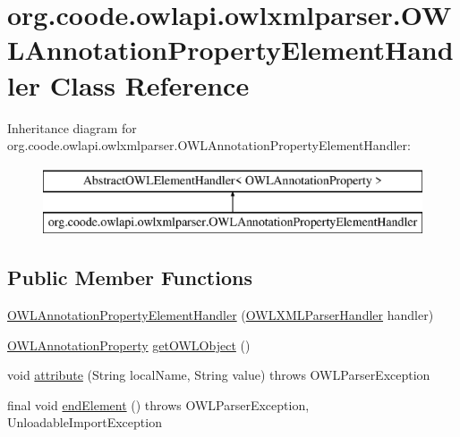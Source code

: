 \hypertarget{classorg_1_1coode_1_1owlapi_1_1owlxmlparser_1_1_o_w_l_annotation_property_element_handler}{\section{org.\-coode.\-owlapi.\-owlxmlparser.\-O\-W\-L\-Annotation\-Property\-Element\-Handler Class Reference}
\label{classorg_1_1coode_1_1owlapi_1_1owlxmlparser_1_1_o_w_l_annotation_property_element_handler}
}
Inheritance diagram for org.\-coode.\-owlapi.\-owlxmlparser.\-O\-W\-L\-Annotation\-Property\-Element\-Handler\-:\begin{figure}[H]
\begin{center}
\leavevmode
\includegraphics[height=2.000000cm]{classorg_1_1coode_1_1owlapi_1_1owlxmlparser_1_1_o_w_l_annotation_property_element_handler}
\end{center}
\end{figure}
\subsection*{Public Member Functions}
\begin{DoxyCompactItemize}
\item 
\hyperlink{classorg_1_1coode_1_1owlapi_1_1owlxmlparser_1_1_o_w_l_annotation_property_element_handler_aada0055aa10fc1ca272bd3254e3d06f3}{O\-W\-L\-Annotation\-Property\-Element\-Handler} (\hyperlink{classorg_1_1coode_1_1owlapi_1_1owlxmlparser_1_1_o_w_l_x_m_l_parser_handler}{O\-W\-L\-X\-M\-L\-Parser\-Handler} handler)
\item 
\hyperlink{interfaceorg_1_1semanticweb_1_1owlapi_1_1model_1_1_o_w_l_annotation_property}{O\-W\-L\-Annotation\-Property} \hyperlink{classorg_1_1coode_1_1owlapi_1_1owlxmlparser_1_1_o_w_l_annotation_property_element_handler_a5c43b48759f16e1ae5517c5e8c6c1af8}{get\-O\-W\-L\-Object} ()
\item 
void \hyperlink{classorg_1_1coode_1_1owlapi_1_1owlxmlparser_1_1_o_w_l_annotation_property_element_handler_ac2a53fbb2d03a9aba7e1fa871f9a03fd}{attribute} (String local\-Name, String value)  throws O\-W\-L\-Parser\-Exception 
\item 
final void \hyperlink{classorg_1_1coode_1_1owlapi_1_1owlxmlparser_1_1_o_w_l_annotation_property_element_handler_a1292abd4a535f6ed1cca5f64ce5f2a23}{end\-Element} ()  throws O\-W\-L\-Parser\-Exception, Unloadable\-Import\-Exception 
\end{DoxyCompactItemize}
